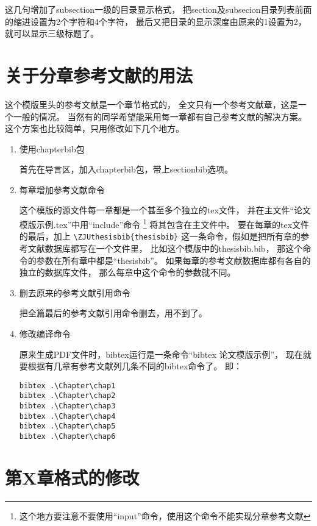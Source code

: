 这几句增加了subsection一级的目录显示格式，
把section及subsecion目录列表前面的缩进设置为2个字符和4个字符，
最后又把目录的显示深度由原来的1设置为2，就可以显示三级标题了。

\section{关于分章参考文献的用法}

这个模版里头的参考文献是一个章节格式的，
全文只有一个参考文献章，这是一个一般的情况。
当然有的同学希望能采用每一章都有自己参考文献的解决方案。
这个方案也比较简单，只用修改如下几个地方。

\begin{enumerate}
\item{使用chapterbib包}

首先在导言区，加入chapterbib包，带上sectionbib选项。

\item{每章增加参考文献命令}

这个模版的源文件每一章都是一个甚至多个独立的tex文件，
并在主文件“论文模版示例.tex”中用“include”命令
\footnote{这个地方要注意不要使用“input”命令，使用这个命令不能实现分章参考文献}
将其包含在主文件中。
要在每章的tex文件的最后，加上
\verb+\ZJUthesisbib{thesisbib}+
这一条命令，假如是把所有章的参考文献数据库都写在一个文件里，
比如这个模版中的thesisbib.bib，
那这个命令的参数在所有章中都是“thesisbib”。
如果每章的参考文献数据库都有各自的独立的数据库文件，
那么每章中这个命令的参数就不同。

\item{删去原来的参考文献引用命令}

把全篇最后的参考文献引用命令删去，用不到了。

\item{修改编译命令}

原来生成PDF文件时，bibtex运行是一条命令“bibtex 论文模版示例”，
现在就要根据有几章有参考文献列几条不同的bibtex命令了。
即：

{
\begin{verbatim}
bibtex .\Chapter\chap1
bibtex .\Chapter\chap2
bibtex .\Chapter\chap3
bibtex .\Chapter\chap4
bibtex .\Chapter\chap5
bibtex .\Chapter\chap6
\end{verbatim}
}

\end{enumerate}

\section{第X章格式的修改}

